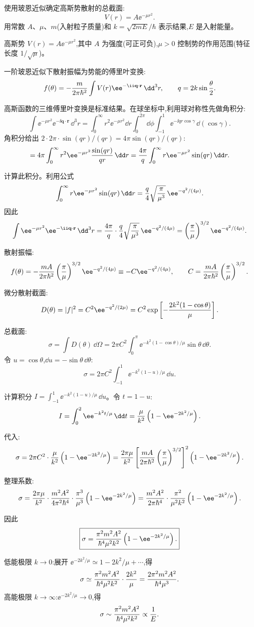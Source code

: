 \begin{question}
使用玻恩近似确定高斯势散射的总截面:
\[
V(r)=A\ee^{-\mu r^2}.
\]
用常数 $A$、$\mu$、$m$(入射粒子质量)和 $k=\sqrt{2mE}/\hbar$ 表示结果,$E$ 是入射能量。
\begin{solution}
高斯势 $V(r)=A\ee^{-\mu r^2}$,其中 $A$ 为强度(可正可负),$\mu>0$ 控制势的作用范围(特征长度 $1/\sqrt{\mu}$)。

一阶玻恩近似下散射振幅为势能的傅里叶变换:
\[
f(\theta)=-{m\over2\pi\hbar^2}\int V(r)\ee^{-\ii\mathbf q\cdot\mathbf r}\,\dd^3r,
\qquad q=2k\sin{\theta\over2}.
\]

高斯函数的三维傅里叶变换是标准结果。在球坐标中,利用球对称性先做角积分:
\[
\int \ee^{-\mu r^2}\ee^{-\ii\mathbf q\cdot\mathbf r}\,\dd^3r
=\int_0^\infty r^2\ee^{-\mu r^2}\dd r\int_0^{2\pi}\dd\phi\int_{-1}^{1}\ee^{-\ii qr\cos\gamma}\,\dd(\cos\gamma).
\]
角积分给出 $2\cdot{2\pi}\cdot{\sin(qr)/(qr)}=4\pi\sin(qr)/(qr)$:
\[
=4\pi\int_0^\infty r^2\ee^{-\mu r^2}{\sin(qr)\over qr}\,\dd r
={4\pi\over q}\int_0^\infty r \ee^{-\mu r^2}\sin(qr)\,\dd r.
\]

计算此积分。利用公式
\[
\int_0^\infty r \ee^{-\mu r^2}\sin(qr)\,\dd r={q\over4}\sqrt{\pi\over\mu^3}\,\ee^{-q^2/(4\mu)}.
\]
因此
\[
\int \ee^{-\mu r^2}\ee^{-\ii\mathbf q\cdot\mathbf r}\,\dd^3r
={4\pi\over q}\cdot{q\over4}\sqrt{\pi\over\mu^3}\,\ee^{-q^2/(4\mu)}
=\left({\pi\over\mu}\right)^{3/2}\ee^{-q^2/(4\mu)}.
\]

散射振幅:
\[
f(\theta)=-{mA\over2\pi\hbar^2}\left({\pi\over\mu}\right)^{3/2}\ee^{-q^2/(4\mu)}
\equiv-C\ee^{-q^2/(4\mu)},
\qquad C={mA\over2\pi\hbar^2}\left({\pi\over\mu}\right)^{3/2}.
\]

微分散射截面:
\[
D(\theta)=|f|^2=C^2\ee^{-q^2/(2\mu)}=C^2\exp\left[-{2k^2(1-\cos\theta)\over\mu}\right].
\]

总截面:
\[
\sigma=\int D(\theta)\,\dd\Omega
=2\pi C^2\int_{0}^{\pi}\ee^{-k^2(1-\cos\theta)/\mu}\sin\theta\,\dd\theta.
\]
令 $u=\cos\theta$,$\dd u=-\sin\theta\,\dd\theta$:
\[
\sigma=2\pi C^2\int_{-1}^{1}\ee^{-k^2(1-u)/\mu}\,\dd u.
\]

计算积分 $\displaystyle I=\int_{-1}^{1}\ee^{-k^2(1-u)/\mu}\,\dd u$。令 $t=1-u$:
\[
I=\int_{0}^{2}\ee^{-k^2t/\mu}\,\dd t
={\mu\over k^2}\left(1-\ee^{-2k^2/\mu}\right).
\]

代入:
\[
\sigma=2\pi C^2\cdot{\mu\over k^2}\left(1-\ee^{-2k^2/\mu}\right)
={2\pi\mu\over k^2}\left[{mA\over2\pi\hbar^2}\left({\pi\over\mu}\right)^{3/2}\right]^2\left(1-\ee^{-2k^2/\mu}\right).
\]

整理系数:
\[
\sigma={2\pi\mu\over k^2}\cdot{m^2A^2\over4\pi^2\hbar^4}\cdot{\pi^3\over\mu^3}\left(1-\ee^{-2k^2/\mu}\right)
={m^2A^2\over2\pi\hbar^4}\cdot{\pi^2\over\mu^2k^2}\left(1-\ee^{-2k^2/\mu}\right).
\]

因此
\[
\boxed{\sigma={\pi^2 m^2 A^2\over\hbar^4\mu^2k^2}\left(1-\ee^{-2k^2/\mu}\right).}
\]

低能极限 $k\to0$:展开 $\ee^{-2k^2/\mu}\simeq 1-2k^2/\mu+\cdots$,得
\[
\sigma\simeq{\pi^2 m^2 A^2\over\hbar^4\mu^2k^2}\cdot{2k^2\over\mu}
={2\pi^2 m^2 A^2\over\hbar^4\mu^3}.
\]
高能极限 $k\to\infty$:$\ee^{-2k^2/\mu}\to0$,得
\[
\sigma\sim{\pi^2 m^2 A^2\over\hbar^4\mu^2k^2}\propto{1\over E}.
\]
\end{solution}
\end{question}

